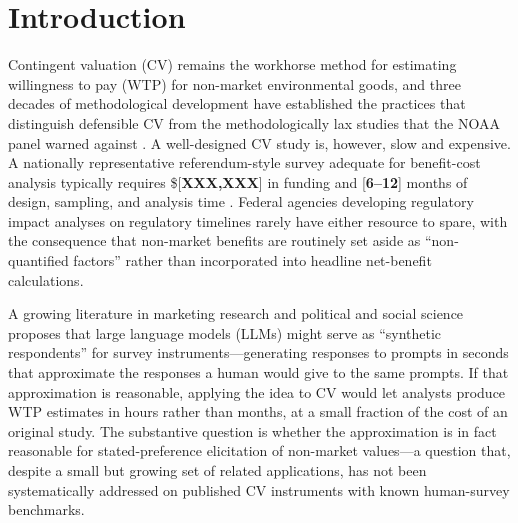 \documentclass[12pt]{article}
\begin{document}
\section{Introduction}\label{sec:intro}

Contingent valuation (CV) remains the workhorse method for estimating
willingness to pay (WTP) for non-market environmental goods, and three decades
of methodological development have established the practices that distinguish
defensible CV from the methodologically lax studies that the NOAA panel
warned against \parencite{Arrow1993, Johnston2017}. A well-designed CV study
is, however, slow and expensive. A nationally representative
referendum-style survey adequate for benefit-cost analysis typically requires
\$[\textbf{XXX,XXX}] in funding and [\textbf{6--12}] months of design,
sampling, and analysis time \parencite{Johnston2017, Champ2017}. Federal
agencies developing regulatory impact analyses on regulatory timelines
rarely have either resource to spare, with the consequence that non-market
benefits are routinely set aside as ``non-quantified factors'' rather than
incorporated into headline net-benefit calculations.

A growing literature in marketing research \parencite{Brand2024, Li2024} and
political and social science \parencite{Argyle2023, Bisbee2024, Horton2023}
proposes that large language models (LLMs) might serve as
``synthetic respondents'' for survey instruments---generating responses to
prompts in seconds that approximate the responses a human would give to the
same prompts. If that approximation is reasonable, applying the idea to CV
would let analysts produce WTP estimates in hours rather than months, at a
small fraction of the cost of an original study. The substantive question is
whether the approximation is in fact reasonable for stated-preference
elicitation of non-market values---a question that, despite a small but
growing set of related applications, has not been systematically addressed
on published CV instruments with known human-survey benchmarks.
\end{document}
